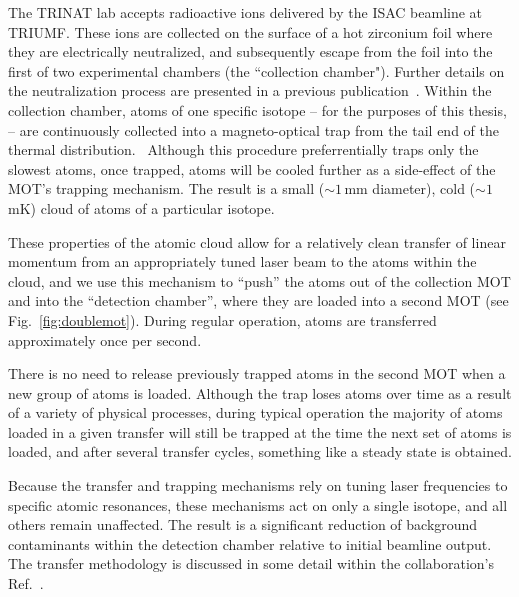 The TRINAT lab accepts radioactive ions delivered by the ISAC beamline at TRIUMF.  These ions are collected on the surface of a hot zirconium foil where they are electrically neutralized, and subsequently escape from the foil into the first of two experimental chambers (the ``collection chamber").  Further details on the neutralization process are presented in a previous publication~\cite{gorelov2000}.  Within the collection chamber, atoms of one specific isotope -- for the purposes of this thesis,   -- are continuously collected into a magneto-optical trap from the tail end of the thermal distribution.~  Although this procedure preferrentially traps only the slowest atoms, once trapped, atoms will be cooled further as a side-effect of the MOT's trapping mechanism.  The result is a small ($\sim\!1\,$mm diameter), cold ($\sim\!1\,$mK) cloud of atoms of a particular isotope.  

These properties of the atomic cloud allow for a relatively clean transfer of linear momentum from an appropriately tuned laser beam to the atoms within the cloud, and we use this mechanism to ``push'' the atoms out of the collection MOT and into the ``detection chamber'', where they are loaded into a second MOT (see Fig.~\ref{fig:doublemot}).  During regular operation, atoms are transferred approximately once per second.  

There is no need to release previously trapped atoms in the second MOT when a new group of atoms is loaded.  Although the trap loses atoms over time as a result of a variety of physical processes, during typical operation the majority of atoms loaded in a given transfer will still be trapped at the time the next set of atoms is loaded, and after several transfer cycles, something like a steady state is obtained.

Because the transfer and trapping mechanisms rely on tuning laser frequencies to specific atomic resonances, these mechanisms act on only a single isotope, and all others remain unaffected.  The result is a significant reduction of background contaminants within the detection chamber relative to initial beamline output.  The transfer methodology is discussed in some detail within the collaboration's Ref.~\cite{swanson}.

